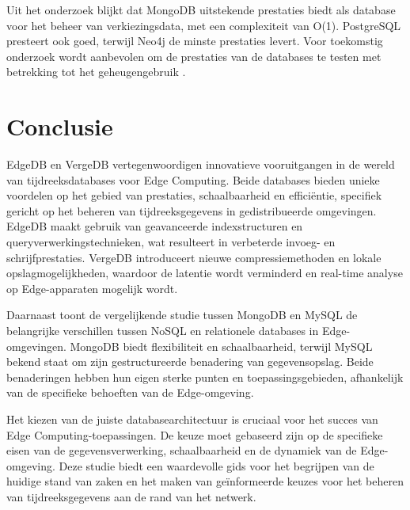 Uit het onderzoek blijkt dat MongoDB uitstekende prestaties biedt als database voor het beheer van verkiezingsdata, met een complexiteit van O(1). PostgreSQL presteert ook goed, terwijl Neo4j de minste prestaties levert. Voor toekomstig onderzoek wordt aanbevolen om de prestaties van de databases te testen met betrekking tot het geheugengebruik \autocite{Gyorodi2015comparative}.



\section{Conclusie}
EdgeDB en VergeDB vertegenwoordigen innovatieve vooruitgangen in de wereld van tijdreeksdatabases voor Edge Computing. Beide databases bieden unieke voordelen op het gebied van prestaties, schaalbaarheid en efficiëntie, specifiek gericht op het beheren van tijdreeksgegevens in gedistribueerde omgevingen. EdgeDB maakt gebruik van geavanceerde indexstructuren en queryverwerkingstechnieken, wat resulteert in verbeterde invoeg- en schrijfprestaties. VergeDB introduceert nieuwe compressiemethoden en lokale opslagmogelijkheden, waardoor de latentie wordt verminderd en real-time analyse op Edge-apparaten mogelijk wordt.

Daarnaast toont de vergelijkende studie tussen MongoDB en MySQL de belangrijke verschillen tussen NoSQL en relationele databases in Edge-omgevingen. MongoDB biedt flexibiliteit en schaalbaarheid, terwijl MySQL bekend staat om zijn gestructureerde benadering van gegevensopslag. Beide benaderingen hebben hun eigen sterke punten en toepassingsgebieden, afhankelijk van de specifieke behoeften van de Edge-omgeving.

Het kiezen van de juiste databasearchitectuur is cruciaal voor het succes van Edge Computing-toepassingen. De keuze moet gebaseerd zijn op de specifieke eisen van de gegevensverwerking, schaalbaarheid en de dynamiek van de Edge-omgeving. Deze studie biedt een waardevolle gids voor het begrijpen van de huidige stand van zaken en het maken van geïnformeerde keuzes voor het beheren van tijdreeksgegevens aan de rand van het netwerk.
